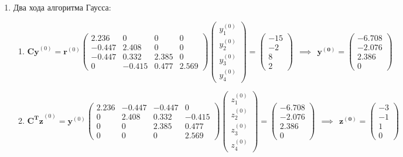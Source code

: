 \begin{enumerate}
    \item Два хода алгоритма Гаусса:
    \begin{enumerate}
        \item $$ \mathbf{Cy}^{(0)} = \mathbf{r}^{(0)}
        \begin{pmatrix}
            2.236  & 0      & 0     & 0     \\
            -0.447 & 2.408  & 0     & 0     \\
            -0.447 & 0.332  & 2.385 & 0     \\
            0      & -0.415 & 0.477 & 2.569
        \end{pmatrix}
        \begin{pmatrix} y^{(0)}_1\\ y^{(0)}_2\\ y^{(0)}_3 \\ y^{(0)}_4 \end{pmatrix} =
        \begin{pmatrix} -15\\ -2\\ 8 \\ 2 \end{pmatrix}~~\implies ~~
        \mathbf{y^{(0)}} = \begin{pmatrix}-6.708\\-2.076\\2.386\\0\end{pmatrix}$$
        \item $$\mathbf{C^Tz}^{(0)} = \mathbf{y}^{(0)}
        \begin{pmatrix}
            2.236 & -0.447 & -0.447 & 0      \\
            0     & 2.408  & 0.332  & -0.415 \\
            0     & 0      & 2.385  & 0.477  \\
            0     & 0      & 0      & 2.569
        \end{pmatrix}
        \begin{pmatrix} z^{(0)}_1\\z^{(0)}_2\\ z^{(0)}_3 \\ z^{(0)}_4 \end{pmatrix} =
        \begin{pmatrix}-6.708\\-2.076\\2.386\\0\end{pmatrix}~~\implies ~~
        \mathbf{z^{(0)}} = \begin{pmatrix}-3\\-1\\1\\0\end{pmatrix}$$
    \end{enumerate}


\end{enumerate}
